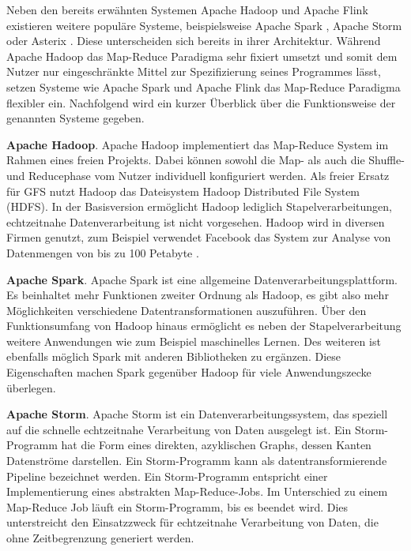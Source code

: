 Neben den bereits erwähnten Systemen Apache Hadoop und Apache Flink existieren weitere populäre Systeme, beispielsweise Apache Spark \cite{SparkWebsite, Zaharia2010}, Apache Storm \cite{StormWebsite, Jones2013} oder Asterix \cite{AsterixWebsite, Alsubaiee2012}. Diese unterscheiden sich bereits in ihrer Architektur. Während Apache Hadoop das Map-Reduce Paradigma sehr fixiert umsetzt und somit dem Nutzer nur eingeschränkte Mittel zur Spezifizierung seines Programmes lässt, setzen Systeme wie Apache Spark und Apache Flink das Map-Reduce Paradigma flexibler ein. Nachfolgend wird ein kurzer Überblick über die Funktionsweise der genannten Systeme gegeben. 

\textbf{Apache Hadoop}. Apache Hadoop implementiert das Map-Reduce System im Rahmen eines freien Projekts. Dabei können sowohl die Map- als auch die Shuffle- und Reducephase vom Nutzer individuell konfiguriert werden. Als freier Ersatz für GFS nutzt Hadoop das Dateisystem Hadoop Distributed File System (HDFS). In der Basisversion ermöglicht Hadoop lediglich Stapelverarbeitungen, echtzeitnahe Datenverarbeitung ist nicht vorgesehen. Hadoop wird in diversen Firmen genutzt, zum Beispiel verwendet Facebook das System zur Analyse von Datenmengen von bis zu 100 Petabyte \cite{Borthakur2013}.

\textbf{Apache Spark}. Apache Spark ist eine allgemeine Datenverarbeitungsplattform. Es beinhaltet mehr Funktionen zweiter Ordnung als Hadoop, es gibt also mehr Möglichkeiten verschiedene Datentransformationen auszuführen. Über den Funktionsumfang von Hadoop hinaus ermöglicht es neben der Stapelverarbeitung weitere Anwendungen wie zum Beispiel maschinelles Lernen. Des weiteren ist ebenfalls möglich Spark mit anderen Bibliotheken zu ergänzen. Diese Eigenschaften machen Spark gegenüber Hadoop für viele Anwendungszecke überlegen. 

\textbf{Apache Storm}. Apache Storm ist ein Datenverarbeitungssystem, das speziell auf die schnelle echtzeitnahe Verarbeitung von Daten ausgelegt ist. Ein Storm-Programm hat die Form eines direkten, azyklischen Graphs, dessen Kanten Datenströme darstellen. Ein Storm-Programm kann als datentransformierende Pipeline bezeichnet werden. Ein Storm-Programm entspricht einer Implementierung eines abstrakten Map-Reduce-Jobs. Im Unterschied zu einem Map-Reduce Job läuft ein Storm-Programm, bis es beendet wird. Dies unterstreicht den Einsatzzweck für echtzeitnahe Verarbeitung von Daten, die ohne Zeitbegrenzung generiert werden.

